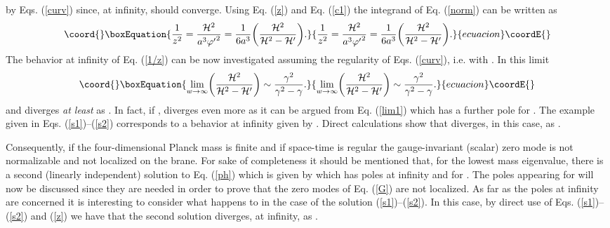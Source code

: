 \documentclass[a4paper,12pt]{article}
\begin{document}
by Eqs. (\ref{curv}) since, at infinity, 
\coordHE{} should converge.
Using  Eq. (\ref{z}) and Eq. (\ref{c1}) the integrand of Eq. (\ref{norm})
can be written as 
\begin{equation}\coord{}\boxEquation{
\frac{1}{z^2} = \frac{{\cal H}^2}{a^3 {\varphi'}^2} = \frac{1}{6a^3}
\biggl(\frac{{\cal H}^2}{ {\cal H}^2 - {\cal H}'}\biggr).
\label{1/z}
}{
\frac{1}{z^2} = \frac{{\cal H}^2}{a^3 {\varphi'}^2} = \frac{1}{6a^3}
\biggl(\frac{{\cal H}^2}{ {\cal H}^2 - {\cal H}'}\biggr).
}{ecuacion}\coordE{}\end{equation}
The behavior at infinity of Eq. (\ref{1/z}) can be now investigated assuming
the regularity of Eqs. (\ref{curv}), i.e. 
 \coordHE{} with \coordHE{}. In this limit 
\begin{equation}\coord{}\boxEquation{
\lim_{w\rightarrow \infty} \biggl(\frac{{\cal H}^2}{{\cal H}^2 
- {\cal H}'} \biggr)\sim \frac{\gamma^2}{\gamma^2 -\gamma} .
\label{lim1}
}{
\lim_{w\rightarrow \infty} \biggl(\frac{{\cal H}^2}{{\cal H}^2 
- {\cal H}'} \biggr)\sim \frac{\gamma^2}{\gamma^2 -\gamma} .
}{ecuacion}\coordE{}\end{equation}
and \coordHE{} diverges {\em at least} as \coordHE{}. In fact, if  \coordHE{}, 
\coordHE{} diverges even more as it can be argued from Eq. (\ref{lim1}) which 
has a further pole for \coordHE{}. 
The  example given in Eqs. (\ref{s1})--(\ref{s2}) corresponds to 
a behavior at infinity given by \coordHE{}.  
Direct calculations show that \coordHE{} diverges, in this case,  as \coordHE{}.

Consequently, if the four-dimensional Planck mass is finite and if 
space-time is  regular the gauge-invariant (scalar) 
 zero mode is not normalizable and not localized on the brane.
For sake of completeness it should be mentioned that, for the lowest 
mass eigenvalue, 
there is a second (linearly independent) solution to Eq. (\ref{ph}) 
which is given by \coordHE{} which has poles at 
infinity and for \coordHE{}.
The poles appearing for \coordHE{}
will now be discussed since they are needed in order to prove that 
the zero modes of Eq. (\ref{G}) are not localized. As far as the poles 
 at infinity are concerned it is interesting to consider 
what happens to  
\coordHE{} in the case of the solution 
(\ref{s1})--(\ref{s2}). In this case, by direct use of Eqs. 
(\ref{s1})--(\ref{s2}) and (\ref{z}) we have that the second solution
diverges, at infinity, as \coordHE{}. 
\end{document}
